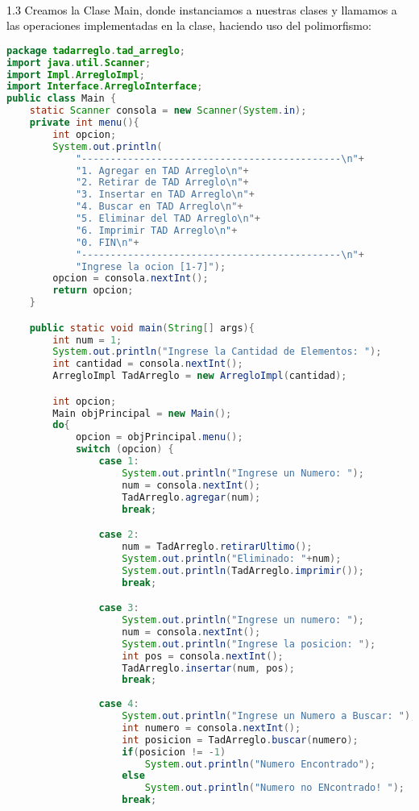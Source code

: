 \documentclass{article}
\begin{document}
\begin{itemize}
\begin{itemize}
\begin{lstlisting}[language=java]
        \end{lstlisting}
        \newline
        \\
        \textcolor{black}{1.3 Creamos la Clase Main, donde instanciamos a nuestras clases y llamamos a las operaciones implementadas en la clase, haciendo uso del polimorfismo:} 
		\begin{lstlisting}[language=java]
package tadarreglo.tad_arreglo;
import java.util.Scanner;
import Impl.ArregloImpl;
import Interface.ArregloInterface;
public class Main {
    static Scanner consola = new Scanner(System.in);
    private int menu(){
        int opcion;
        System.out.println(
            "---------------------------------------------\n"+
            "1. Agregar en TAD Arreglo\n"+
            "2. Retirar de TAD Arreglo\n"+
            "3. Insertar en TAD Arreglo\n"+
            "4. Buscar en TAD Arreglo\n"+
            "5. Eliminar del TAD Arreglo\n"+
            "6. Imprimir TAD Arreglo\n"+
            "0. FIN\n"+
            "---------------------------------------------\n"+
            "Ingrese la ocion [1-7]");
        opcion = consola.nextInt();
        return opcion;
    }

    public static void main(String[] args){
        int num = 1;
        System.out.println("Ingrese la Cantidad de Elementos: ");
        int cantidad = consola.nextInt();
        ArregloImpl TadArreglo = new ArregloImpl(cantidad);

        int opcion;
        Main objPrincipal = new Main();
        do{
            opcion = objPrincipal.menu();
            switch (opcion) {
                case 1:
                    System.out.println("Ingrese un Numero: ");
                    num = consola.nextInt();
                    TadArreglo.agregar(num);
                    break;

                case 2:
                    num = TadArreglo.retirarUltimo();
                    System.out.println("Eliminado: "+num);
                    System.out.println(TadArreglo.imprimir());
                    break;

                case 3:
                    System.out.println("Ingrese un numero: ");
                    num = consola.nextInt();
                    System.out.println("Ingrese la posicion: ");
                    int pos = consola.nextInt();
                    TadArreglo.insertar(num, pos);
                    break;
                    
                case 4:
                    System.out.println("Ingrese un Numero a Buscar: ");
                    int numero = consola.nextInt();
                    int posicion = TadArreglo.buscar(numero);
                    if(posicion != -1)
                        System.out.println("Numero Encontrado");
                    else
                        System.out.println("Numero no ENcontrado! ");
                    break;
                    

\end{lstlisting}
\end{itemize}
\end{itemize}
\end{document}
